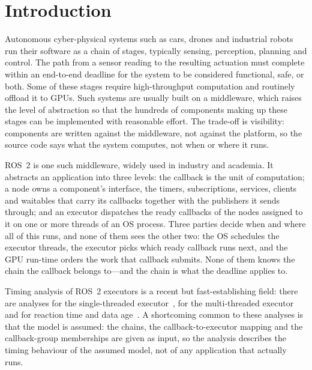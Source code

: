 
\section{Introduction}
\label{sec:intro}

Autonomous cyber-physical systems such as cars, drones and industrial robots run
their software as a chain of stages, typically sensing, perception, planning and
control. The path from a sensor reading to the resulting actuation must complete
within an end-to-end deadline for the system to be considered functional, safe,
or both. Some of these stages require high-throughput computation and routinely
offload it to GPUs. Such systems are usually built on a middleware, which raises
the level of abstraction so that the hundreds of components making up these
stages can be implemented with reasonable effort. The trade-off is visibility:
components are written against the middleware, not against the platform, so the
source code says what the system computes, not when or where it runs.

ROS~2 is one such middleware, widely used in industry and academia. It abstracts
an application into three levels: the callback is the unit of computation; a
node owns a component's interface, the timers, subscriptions, services, clients
and waitables that carry its callbacks together with the publishers it sends
through; and an executor dispatches the ready callbacks of the nodes assigned to
it on one or more threads of an OS process. Three parties decide when and where
all of this runs, and none of them sees the other two: the OS schedules the
executor threads, the executor picks which ready callback runs next, and the GPU
run-time orders the work that callback submits. None of them knows the chain the
callback belongs to---and the chain is what the deadline applies to.

Timing analysis of ROS~2 executors is a recent but fast-establishing field:
there are analyses for the single-threaded
executor~\cite{casini-19-reservationbased}, for the multi-threaded
executor~\cite{arafat-2026-mtexecutor-cbgroups} and for reaction time and data
age~\cite{teper-2024-end2endmtexecutoranalysisoptimization}.
A shortcoming common to these analyses is that the model is assumed: the chains,
the callback-to-executor mapping and the callback-group memberships are given as
input, so the analysis describes the timing behaviour of the assumed model, not
of any application that actually runs.

